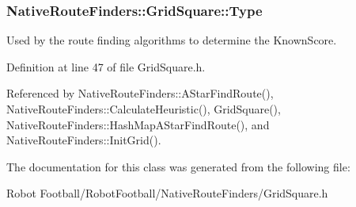 \hypertarget{class_native_route_finders_1_1_grid_square_a004dc984a2bcff5c31920e78cab22cfd}{
\subsubsection[{Type}]{ {\bf Native\-Route\-Finders\-::\-Grid\-Square\-::\-Type}}}\label{class_native_route_finders_1_1_grid_square_a004dc984a2bcff5c31920e78cab22cfd}
Used by the route finding algorithms to determine the Known\-Score. 

Definition at line 47 of file Grid\-Square.\-h.



Referenced by Native\-Route\-Finders\-::\-A\-Star\-Find\-Route(), Native\-Route\-Finders\-::\-Calculate\-Heuristic(), Grid\-Square(), Native\-Route\-Finders\-::\-Hash\-Map\-A\-Star\-Find\-Route(), and Native\-Route\-Finders\-::\-Init\-Grid().



The documentation for this class was generated from the following file\-:\begin{DoxyCompactItemize}
\item 
Robot Football/\-Robot\-Football/\-Native\-Route\-Finders/Grid\-Square.\-h\end{DoxyCompactItemize}

